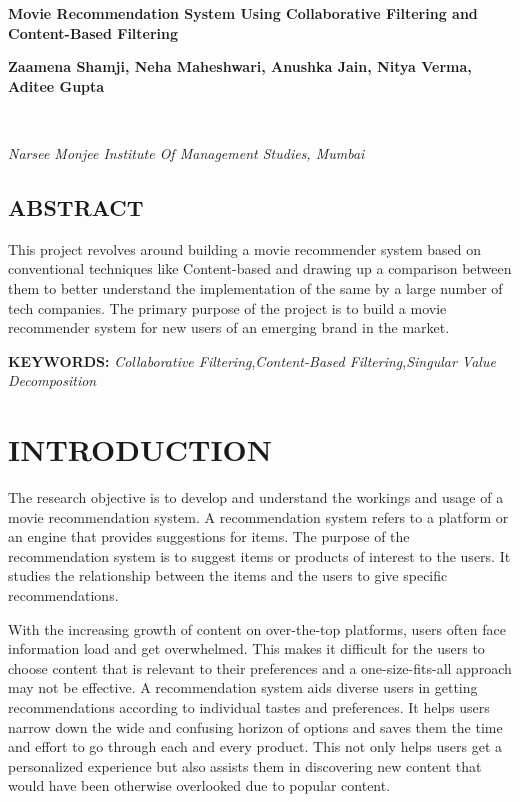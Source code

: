 \documentclass[a4paper,10pt]{article}
\begin{document}
\noindent 
\begin{center}
\textbf{{\Large Movie Recommendation System Using Collaborative Filtering and Content-Based Filtering}} \\
\end{center}

\noindent 
\begin{center}
\textbf{ Zaamena Shamji, Neha Maheshwari, Anushka Jain, Nitya Verma, Aditee Gupta } 
\end{center}\\[-0.5cm]

\begin{center}
\textit{Narsee Monjee Institute Of Management Studies, Mumbai}\\
\end{center}


\noindent 
\begin{center}
    \subsection*{ABSTRACT}
    This project revolves around building a movie recommender system based on conventional techniques like Content-based and drawing up a comparison between them to better understand the implementation of the same by a large number of tech companies. The primary purpose of the project is to build a movie recommender system for new users of an emerging brand in the market.

\end{center}

\noindent 
\textbf{KEYWORDS:} \textit{Collaborative Filtering},\textit{Content-Based Filtering},\textit{Singular Value Decomposition}


\section{INTRODUCTION}

The research objective is to develop and understand the workings and usage of a movie recommendation system. A recommendation system refers to a platform or an engine that provides suggestions for items. The purpose of the recommendation system is to suggest items or products of interest to the users. It studies the relationship between the items and the users to give specific recommendations.

With the increasing growth of content on over-the-top platforms, users often face information load and get overwhelmed. This makes it difficult for the users to choose content that is relevant to their preferences and a one-size-fits-all approach may not be effective. A recommendation system aids diverse users in getting recommendations according to individual tastes and preferences. It helps users narrow down the wide and confusing horizon of options and saves them the time and effort to go through each and every product. This not only helps users get a personalized experience but also assists them in discovering new content that would have been otherwise overlooked due to popular content.
\end{document}
